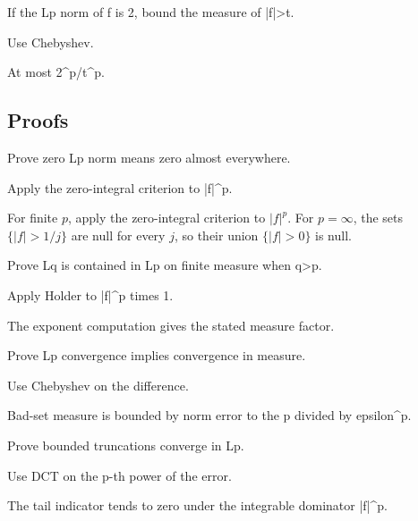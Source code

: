 \begin{exercise}[Chebyshev]\label{exr:iii06-expand-05}
If the Lp norm of f is 2, bound the measure of |f|>t.
\end{exercise}
\begin{hint}
Use Chebyshev.
\end{hint}
\begin{solution}
At most 2\textasciicircum{}p/t\textasciicircum{}p.
\end{solution}

\subsection*{Proofs}

\begin{exercise}\label{exr:iii06-expand-06}
Prove zero Lp norm means zero almost everywhere.
\end{exercise}
\begin{hint}
Apply the zero-integral criterion to |f|\textasciicircum{}p.
\end{hint}
\begin{solution}
For finite $p$, apply the zero-integral criterion to $|f|^p$. For $p=\infty$, the sets $\{|f|>1/j\}$ are null for every $j$, so their union $\{|f|>0\}$ is null.
\end{solution}

\begin{exercise}\label{exr:iii06-expand-07}
Prove Lq is contained in Lp on finite measure when q>p.
\end{exercise}
\begin{hint}
Apply Holder to |f|\textasciicircum{}p times 1.
\end{hint}
\begin{solution}
The exponent computation gives the stated measure factor.
\end{solution}

\begin{exercise}[Lp to measure]\label{exr:iii06-expand-08}
Prove Lp convergence implies convergence in measure.
\end{exercise}
\begin{hint}
Use Chebyshev on the difference.
\end{hint}
\begin{solution}
Bad-set measure is bounded by norm error to the p divided by epsilon\textasciicircum{}p.
\end{solution}

\begin{exercise}[Truncation]\label{exr:iii06-expand-09}
Prove bounded truncations converge in Lp.
\end{exercise}
\begin{hint}
Use DCT on the p-th power of the error.
\end{hint}
\begin{solution}
The tail indicator tends to zero under the integrable dominator |f|\textasciicircum{}p.
\end{solution}


